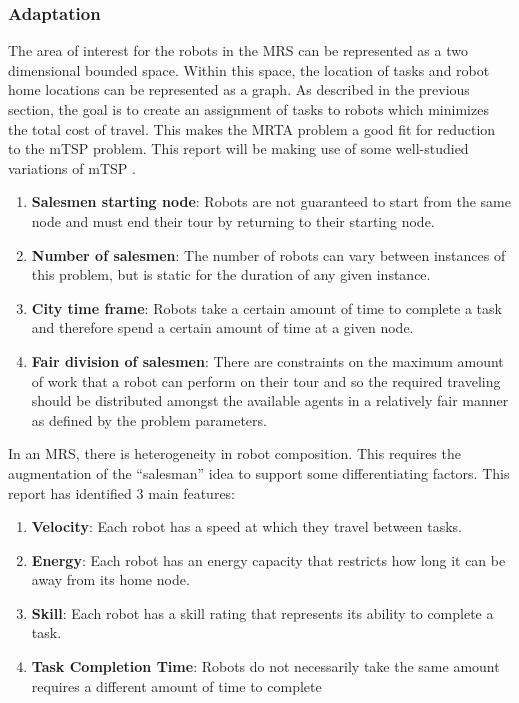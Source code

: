 \documentclass[a4paper]{article}
\begin{document}
\subsubsection{Adaptation}
The area of interest for the robots in the MRS can be represented as a two dimensional bounded space. Within this space, the location of tasks and robot home locations can be represented as a graph. As described in the previous section, the goal is to create an assignment of tasks to robots which minimizes the total cost of travel. This makes the MRTA problem a good fit for reduction to the mTSP problem. This report will be making use of some well-studied variations of mTSP \cite{Badreldin}.
\begin{enumerate}
\item \textbf{Salesmen starting node}: Robots are not guaranteed to start from the same node and must end their tour by returning to their starting node.
\item \textbf{Number of salesmen}: The number of robots can vary between instances of this problem, but is static for the duration of any given instance.
\item \textbf{City time frame}: Robots take a certain amount of time to complete a task and therefore spend a certain amount of time at a given node.
\item \textbf{Fair division of salesmen}: There are constraints on the maximum amount of work that a robot can perform on their tour and so the required traveling should be distributed amongst the available agents in a relatively fair manner as defined by the problem parameters.
\end{enumerate}

In an MRS, there is heterogeneity in robot composition. This requires the augmentation of the ``salesman'' idea to support some differentiating factors. This report has identified 3 main features:

\begin{enumerate}
\item \textbf{Velocity}: Each robot has a speed at which they travel between tasks.
\item \textbf{Energy}: Each robot has an energy capacity that restricts how long it can be away from its home node.
\item \textbf{Skill}: Each robot has a skill rating that represents its ability to complete a task.
\item \textbf{Task Completion Time}: Robots do not necessarily take the same amount requires a different amount of time to complete

\end{enumerate}
\end{document}
